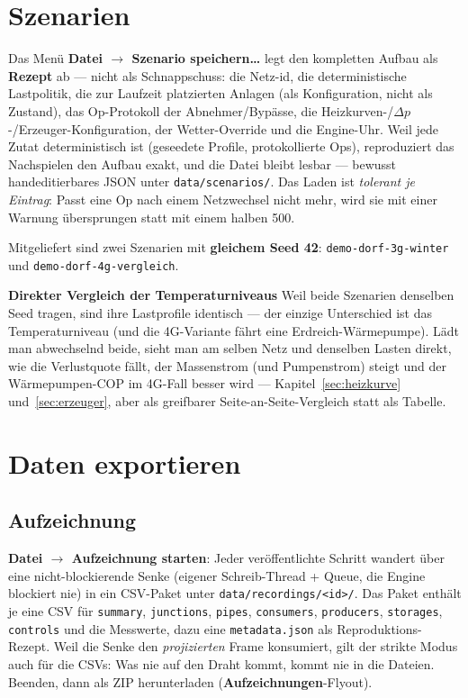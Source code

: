 \documentclass[11pt,a4paper,parskip=half]{scrreprt}
\newcommand{\ui}[1]{\textsf{\bfseries #1}}
\newcommand{\api}[1]{\texttt{#1}}
\newenvironment{beispiel}[1][Beispiel]
  {\par\medskip{\color{bsp}\hrule height 0.8pt}\nopagebreak\smallskip
   \noindent\textbf{\textsf{\textcolor{bsp}{#1}}}\quad\ignorespaces}
  {\par\nopagebreak\smallskip{\color{bsp}\hrule height 0.8pt}\par\medskip}
\begin{document}
\chapter{Szenarien}
\label{ch:szenarien}

Das Menü \ui{Datei $\rightarrow$ Szenario speichern…} legt den kompletten
Aufbau als \textbf{Rezept} ab --- nicht als Schnappschuss: die Netz-id, die
deterministische Lastpolitik, die zur Laufzeit platzierten Anlagen (als
Konfiguration, nicht als Zustand), das Op-Protokoll der Abnehmer/Bypässe, die
Heizkurven-/$\Delta p$-/Erzeuger-Konfiguration, der Wetter-Override und die
Engine-Uhr. Weil jede Zutat deterministisch ist (geseedete Profile,
protokollierte Ops), reproduziert das Nachspielen den Aufbau exakt, und die
Datei bleibt lesbar --- bewusst handeditierbares JSON unter
\api{data/scenarios/}. Das Laden ist \emph{tolerant je Eintrag}: Passt eine Op
nach einem Netzwechsel nicht mehr, wird sie mit einer Warnung übersprungen statt
mit einem halben 500.

Mitgeliefert sind zwei Szenarien mit \textbf{gleichem Seed 42}:
\texttt{demo-dorf-3g-winter} und \texttt{demo-dorf-4g-vergleich}.

\begin{beispiel}[Direkter Vergleich der Temperaturniveaus]
Weil beide Szenarien denselben Seed tragen, sind ihre Lastprofile identisch ---
der einzige Unterschied ist das Temperaturniveau (und die 4G-Variante fährt eine
Erdreich-Wärmepumpe). Lädt man abwechselnd beide, sieht man am selben Netz und
denselben Lasten direkt, wie die Verlustquote fällt, der Massenstrom (und
Pumpenstrom) steigt und der Wärmepumpen-COP im 4G-Fall besser wird ---
Kapitel~\ref{sec:heizkurve} und~\ref{sec:erzeuger}, aber als greifbarer
Seite-an-Seite-Vergleich statt als Tabelle.
\end{beispiel}

\chapter{Daten exportieren}
\label{ch:export}

\section{Aufzeichnung}

\ui{Datei $\rightarrow$ Aufzeichnung starten}: Jeder veröffentlichte Schritt
wandert über eine nicht-blockierende Senke (eigener Schreib-Thread + Queue, die
Engine blockiert nie) in ein CSV-Paket unter \api{data/recordings/<id>/}. Das
Paket enthält je eine CSV für \texttt{summary}, \texttt{junctions},
\texttt{pipes}, \texttt{consumers}, \texttt{producers}, \texttt{storages},
\texttt{controls} und die Messwerte, dazu eine \texttt{metadata.json} als
Reproduktions-Rezept. Weil die Senke den \emph{projizierten} Frame konsumiert,
gilt der strikte Modus auch für die CSVs: Was nie auf den Draht kommt, kommt nie
in die Dateien. Beenden, dann als ZIP herunterladen (\ui{Aufzeichnungen}-Flyout).
\end{document}

